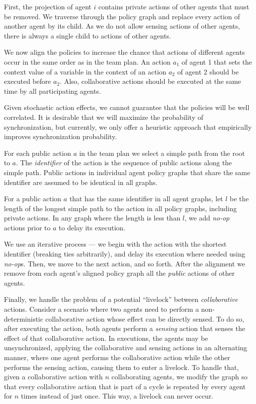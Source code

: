 \documentclass[letterpaper]{article} %
\theoremstyle{definition}
\begin{document}
First, the projection of agent $i$ contains private actions of other agents that must be removed. We traverse through the policy graph and replace every action of another agent by its child. As we do not allow sensing actions of other agents, there is always a single child to actions of other agents.

We now align the policies to increase  the chance that actions of different agents occur in the same order as in the team plan. An action $a_1$ of agent 1 that sets the context value of a variable in the context of an action $a_2$ of agent 2 should be executed before $a_2$. Also, collaborative actions should be executed at the same time by all participating agents.  


Given stochastic action effects, we cannot guarantee that the policies will be well correlated. It is desirable that we will maximize the probability of synchronization, but currently, we only offer a heuristic approach that empirically improves synchronization probability. 

For each public action $a$ in the team plan we select a simple path from the root to $a$. The {\em identifier} of the action is the sequence of public actions along the simple path. Public actions in individual agent policy graphs that share the same identifier are assumed to be identical in all graphs.

For a public action $a$ that has the same identifier in all agent graphs, let $l$ be the length of the longest simple path to the action in all policy graphs, including private actions. In any graph where the length is less than $l$, we add {\em no-op} actions prior to $a$ to delay its execution.

We use an iterative process --- we begin with the action with the shortest identifier (breaking ties arbitrarily), and delay its execution where needed using {\em no-op}s. Then, we move to the next action, and so forth.
After the alignment we remove from each agent's aligned policy graph all the {\em public} actions of other agents.

Finally, we handle the problem of a potential ``livelock'' between \emph{collaborative} actions. Consider a scenario where two agents need to perform a non-deterministic collaborative action whose effect can be directly sensed. To do so, after executing the action, both agents perform a \emph{sensing} action that senses the effect of that collaborative action.
In executions, the agents may be unsynchronized,  applying the collaborative and sensing actions in an alternating manner, where one agent performs the collaborative action while the other performs the sensing action, causing them to enter a livelock. To handle that, given a collaborative action with $n$ collaborating agents, we modify the graph so that every collaborative action that is part of a cycle is repeated by every agent for $n$ times instead of just once. This way, a livelock can never occur.
\end{document}
